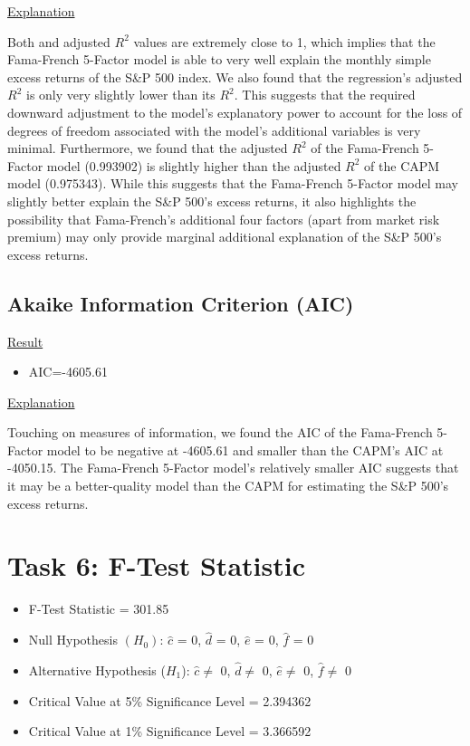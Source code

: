 \documentclass[a4paper]{article}
\begin{document}
\underline{Explanation}

Both and adjusted $R^2$ values are extremely close to 1, which implies that the Fama-French 5-Factor model is able to very well explain the monthly simple excess returns of the S\&P 500 index. 
We also found that the regression’s adjusted $R^2$ is only very slightly lower than its $R^2$. This suggests that the required downward adjustment to the model’s explanatory power to account for the loss of degrees of freedom associated with the model’s additional variables is very minimal. 
Furthermore, we found that the adjusted $R^2$ of the Fama-French 5-Factor model (0.993902) is slightly higher than the adjusted $R^2$ of the CAPM model (0.975343). While this suggests that the Fama-French 5-Factor model may slightly better explain the S\&P 500’s excess returns, it also highlights the possibility that Fama-French’s additional four factors (apart from market risk premium) may only provide marginal additional explanation of the S\&P 500’s excess returns. 

\subsection{Akaike Information Criterion (AIC)}
\underline{Result}
\begin{itemize}
	\item AIC=-4605.61
\end{itemize}

\underline{Explanation}

Touching on measures of information, we found the AIC of the Fama-French 5-Factor model to be negative at -4605.61 and smaller than the CAPM’s AIC at -4050.15. The Fama-French 5-Factor model’s relatively smaller AIC suggests that it may be a better-quality model than the CAPM for estimating the S\&P 500’s excess returns. 

\newpage
\setcounter{secnumdepth}{1}
\section*{Task 6: F-Test Statistic}
\label{sec:introduction}

\begin{itemize}
	\item F-Test Statistic = 301.85
	\item Null Hypothesis $(H_0)$: $\hat{c}$ = 0, $\hat{d}$ = 0, $\hat{e}$ = 0, $\hat{f}$ = 0
	\item Alternative Hypothesis ($H_1$): $\hat{c}\ne$ 0, $\hat{d}\ne$ 0, $\hat{e} \ne$ 0, $\hat{f}\ne$ 0
	\item Critical Value at 5\% Significance Level = 2.394362
	\item Critical Value at 1\% Significance Level = 3.366592
\end{itemize}
\end{document}
